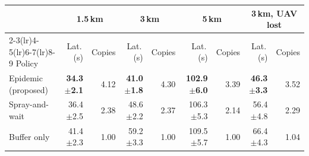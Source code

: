 \begin{tabular}{lrrrrrrrr}
\toprule
& \multicolumn{2}{c}{1.5\,km} & \multicolumn{2}{c}{3\,km} & \multicolumn{2}{c}{5\,km} & \multicolumn{2}{c}{3\,km, UAV lost}\\
\cmidrule(lr){2-3}\cmidrule(lr){4-5}\cmidrule(lr){6-7}\cmidrule(lr){8-9}
Policy & Lat.\,(s) & Copies & Lat.\,(s) & Copies & Lat.\,(s) & Copies & Lat.\,(s) & Copies\\
\midrule
Epidemic (proposed) & \textbf{34.3{\scriptsize$\pm$2.1}} & 4.12 & \textbf{41.0{\scriptsize$\pm$1.8}} & 4.30 & \textbf{102.9{\scriptsize$\pm$6.0}} & 3.39 & \textbf{46.3{\scriptsize$\pm$3.3}} & 3.52 \\
Spray-and-wait & 36.4{\scriptsize$\pm$2.5} & 2.38 & 48.6{\scriptsize$\pm$2.2} & 2.37 & 106.3{\scriptsize$\pm$5.3} & 2.14 & 56.4{\scriptsize$\pm$4.8} & 2.29 \\
Buffer only & 41.4{\scriptsize$\pm$2.3} & 1.00 & 59.2{\scriptsize$\pm$3.3} & 1.00 & 109.5{\scriptsize$\pm$5.7} & 1.00 & 66.4{\scriptsize$\pm$4.3} & 1.04 \\
\bottomrule
\end{tabular}
